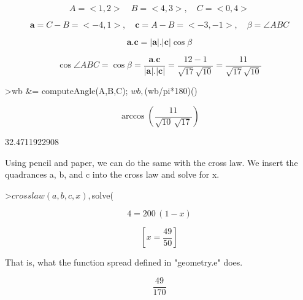 \documentclass[a4paper,10pt]{article}
\begin{document}
\begin{eulernotebook}
\begin{eulercomment}
\begin{eulercomment}
\begin{eulercomment}
\begin{eulercomment}
\begin{eulercomment}
\end{eulercomment}
\begin{eulerformula}
\[
A=<1,2>\quad B=<4,3>,\quad C=<0,4>
\]
\end{eulerformula}
\begin{eulerformula}
\[
\mathbf{a}=C-B=<-4,1>,\quad \mathbf{c}=A-B=<-3,-1>,\quad \beta=\angle ABC
\]
\end{eulerformula}
\begin{eulerformula}
\[
\mathbf{a}.\mathbf{c}=|\mathbf{a}|.|\mathbf{c}|\cos \beta
\]
\end{eulerformula}
\begin{eulerformula}
\[
\cos \angle ABC =\cos\beta=\frac{\mathbf{a}.\mathbf{c}}{|\mathbf{a}|.|\mathbf{c}|}=\frac{12-1}{\sqrt{17}\sqrt{10}}=\frac{11}{\sqrt{17}\sqrt{10}}
\]
\end{eulerformula}
\begin{eulerprompt}
>wb &= computeAngle(A,B,C); $wb, $(wb/pi*180)()
\end{eulerprompt}
\begin{eulerformula}
\[
\arccos \left(\frac{11}{\sqrt{10}\,\sqrt{17}}\right)
\]
\end{eulerformula}
\begin{euleroutput}
  32.4711922908
\end{euleroutput}
\begin{eulercomment}
Using pencil and paper, we can do the same with the cross law. We
insert the quadrances a, b, and c into the cross law and solve for x.
\end{eulercomment}
\begin{eulerprompt}
>$crosslaw(a,b,c,x), $solve(%
\end{eulerprompt}
\begin{eulerformula}
\[
4=200\,\left(1-x\right)
\]
\end{eulerformula}
\begin{eulerformula}
\[
\left[ x=\frac{49}{50} \right] 
\]
\end{eulerformula}
\begin{eulercomment}
That is, what the function spread defined in "geometry.e" does.
\end{eulercomment}
\begin{eulerformula}
\[
\frac{49}{170}
\]
\end{eulerformula}
\begin{eulercomment}

\end{eulercomment}
\end{eulercomment}
\end{eulercomment}
\end{eulercomment}
\end{eulercomment}
\end{eulernotebook}
\end{document}
